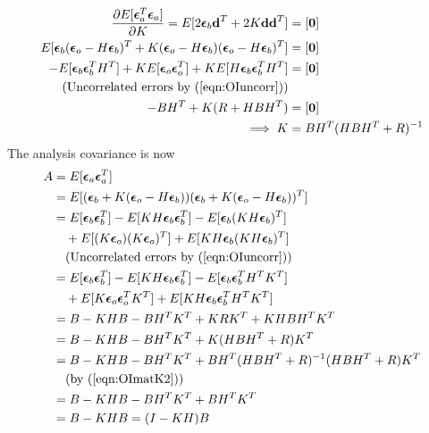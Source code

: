 \begin{align}
\frac{\partial E[\bm{\epsilon}_a^T\bm{\epsilon}_a]}{\partial K} = E[2\bm{\epsilon}_b\textbf{d}^T + 2K\textbf{d}\textbf{d}^T] &= [\textbf{0}] \nonumber \\
E[\bm{\epsilon}_b(\bm{\epsilon}_o -  H\bm{\epsilon}_b)^T + K(\bm{\epsilon}_o -  H\bm{\epsilon}_b)(\bm{\epsilon}_o -  H\bm{\epsilon}_b)^T] &= [\textbf{0}] \nonumber \\
-E[\bm{\epsilon}_b\bm{\epsilon}_b^TH^T] + KE[\bm{\epsilon}_o\bm{\epsilon}_o^T] + KE[H\bm{\epsilon}_b\bm{\epsilon}_b^TH^T] &= [\textbf{0}] \nonumber \\ 
 \text{(Uncorrelated errors by (\ref{eqn:OIuncorr}))} & \nonumber \\
-BH^T + K(R+HBH^T) &= [\textbf{0}] \nonumber \\
\implies K &= BH^T(HBH^T+R)^{-1} \label{eqn:OImatK2}
\end{align}
The analysis covariance is now
\begin{align}
A &= E[\bm{\epsilon}_a\bm{\epsilon}_a^T] \nonumber \\
&= E[(\bm{\epsilon}_b + K(\bm{\epsilon}_o - H\bm{\epsilon}_b))(\bm{\epsilon}_b + K(\bm{\epsilon}_o - H\bm{\epsilon}_b))^T] \nonumber \\
&= E[\bm{\epsilon}_b\bm{\epsilon}_b^T] - E[KH\bm{\epsilon}_b\bm{\epsilon}_b^T] - E[\bm{\epsilon}_b(KH\bm{\epsilon}_b)^T] \nonumber \\
&\quad + E[(K\bm{\epsilon}_o)(K\bm{\epsilon}_o)^T] + E[KH\bm{\epsilon}_b(KH\bm{\epsilon}_b)^T] \nonumber \\
&\quad \text{(Uncorrelated errors by (\ref{eqn:OIuncorr}))} \nonumber \\
&= E[\bm{\epsilon}_b\bm{\epsilon}_b^T] - E[KH\bm{\epsilon}_b\bm{\epsilon}_b^T] - E[\bm{\epsilon}_b\bm{\epsilon}_b^TH^TK^T] \nonumber \\
&\quad + E[K\bm{\epsilon}_o\bm{\epsilon}_o^TK^T] + E[KH\bm{\epsilon}_b\bm{\epsilon}_b^TH^TK^T] \nonumber \\
&= B - KHB - BH^TK^T + KRK^T + KHBH^TK^T \nonumber \\
&= B - KHB - BH^TK^T + K(HBH^T+R)K^T \nonumber \\
&= B - KHB - BH^TK^T + BH^T(HBH^T+R)^{-1}(HBH^T+R)K^T \nonumber \\
&\quad \text{(by (\ref{eqn:OImatK2}))} \nonumber \\
&= B - KHB - BH^TK^T + BH^TK^T \nonumber \\
&= B - KHB = (I-KH)B \label{eqn:OIcovA}
\end{align}
